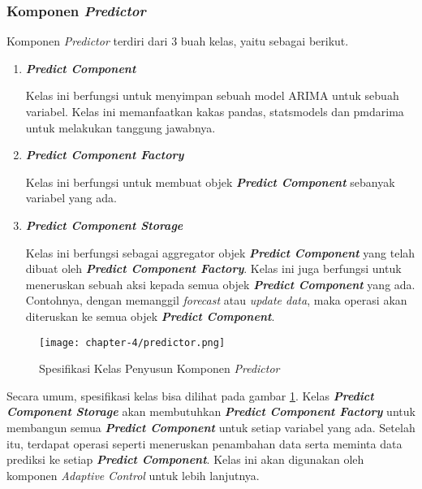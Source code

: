 \subsubsection{Komponen \textit{Predictor}}
Komponen \textit{Predictor} terdiri dari 3 buah kelas, yaitu sebagai berikut.
\begin{enumerate}
    \item \textbf{\textit{Predict Component}}
    
    Kelas ini berfungsi untuk menyimpan sebuah model ARIMA untuk sebuah variabel. Kelas ini memanfaatkan kakas pandas, statsmodels dan pmdarima untuk melakukan tanggung jawabnya.

    \item \textbf{\textit{Predict Component Factory}}
    
    Kelas ini berfungsi untuk membuat objek \textbf{\textit{Predict Component}} sebanyak variabel yang ada. 

    \item \textbf{\textit{Predict Component Storage}}
    
    Kelas ini berfungsi sebagai aggregator objek \textbf{\textit{Predict Component}} yang telah dibuat oleh \textbf{\textit{Predict Component Factory}}. Kelas ini juga berfungsi untuk meneruskan sebuah aksi kepada semua objek \textbf{\textit{Predict Component}} yang ada. Contohnya, dengan memanggil \textit{forecast} atau \textit{update data}, maka operasi akan diteruskan ke semua objek \textbf{\textit{Predict Component}}.

\end{enumerate}

\begin{figure}[h]
    \centering
    \texttt{[image: chapter-4/predictor.png]}
    \caption{Spesifikasi Kelas Penyusun Komponen \textit{Predictor}}
    \label{fig:predictor-spek}
\end{figure}

Secara umum, spesifikasi kelas bisa dilihat pada gambar \ref{fig:predictor-spek}. Kelas \textbf{\textit{Predict Component Storage}} akan membutuhkan \textbf{\textit{Predict Component Factory}} untuk membangun semua \textbf{\textit{Predict Component}} untuk setiap variabel yang ada. Setelah itu, terdapat operasi seperti meneruskan penambahan data serta meminta data prediksi ke setiap \textbf{\textit{Predict Component}}. Kelas ini akan digunakan oleh komponen \textit{Adaptive Control} untuk lebih lanjutnya.

